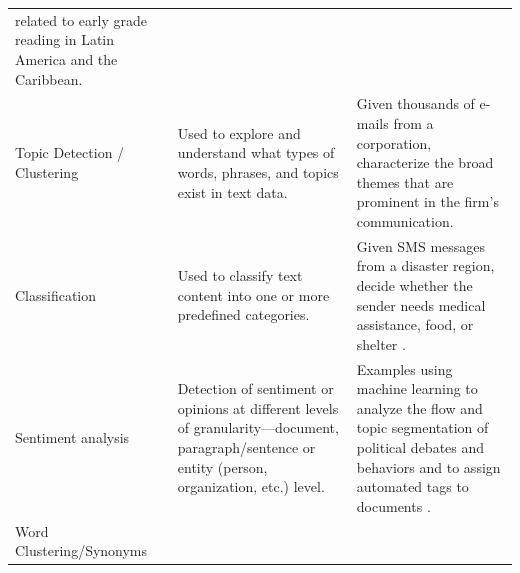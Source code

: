 \documentclass[]{krantz}
\begin{document}
\begin{longtable}[]{@{}lll@{}}
\begin{minipage}[t]{0.63\columnwidth}
related to early grade reading in Latin America and the Caribbean.
\strut
\end{minipage}\tabularnewline
\begin{minipage}[t]{0.12\columnwidth}\raggedright\strut
Topic Detection / Clustering\strut
\end{minipage} & \begin{minipage}[t]{0.16\columnwidth}\raggedright\strut
Used to explore and understand what types of words, phrases, and topics
exist in text data.\strut
\end{minipage} & \begin{minipage}[t]{0.63\columnwidth}\raggedright\strut
Given thousands of e-mails from a corporation, characterize the broad
themes that are prominent in the firm's communication.\strut
\end{minipage}\tabularnewline
\begin{minipage}[t]{0.12\columnwidth}\raggedright\strut
Classification\strut
\end{minipage} & \begin{minipage}[t]{0.16\columnwidth}\raggedright\strut
Used to classify text content into one or more predefined
categories.\strut
\end{minipage} & \begin{minipage}[t]{0.63\columnwidth}\raggedright\strut
Given SMS messages from a disaster region, decide whether the sender
needs medical assistance, food, or shelter \citep{yates-10}.\strut
\end{minipage}\tabularnewline
\begin{minipage}[t]{0.12\columnwidth}\raggedright\strut
Sentiment analysis\strut
\end{minipage} & \begin{minipage}[t]{0.16\columnwidth}\raggedright\strut
Detection of sentiment or opinions at different levels of
granularity---document, paragraph/sentence or entity (person,
organization, etc.) level.\strut
\end{minipage} & \begin{minipage}[t]{0.63\columnwidth}\raggedright\strut
Examples using machine learning to analyze the flow and topic
segmentation of political debates and behaviors
\citep{nguyen-12, Nguyen:Boyd-Graber:Resnik:Miler-2015} and to assign
automated tags to documents \citep{tuarob-13}.\strut
\end{minipage}\tabularnewline
\begin{minipage}[t]{0.12\columnwidth}\raggedright\strut
Word Clustering/Synonyms\strut
\end{minipage} & \begin{minipage}[t]{0.16\columnwidth}\raggedright\strut

\end{minipage}
\end{longtable}
\end{document}
